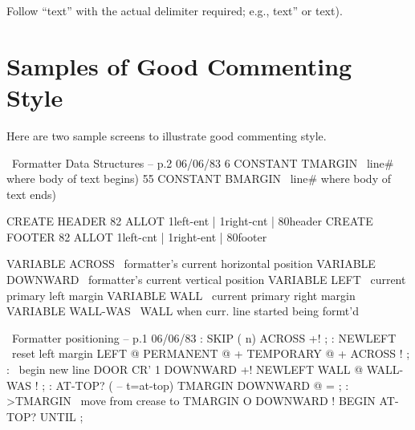 \noindent Follow ``text'' with the actual delimiter required; e.g., text'' or text).

\section{Samples of Good Commenting Style}

Here are two sample screens to illustrate good commenting
style.

\setcounter{screen}{126}
\begin{Screen}
\ Formatter         Data Structures -- p.2             06/06/83
 6 CONSTANT TMARGIN \ line# where body of text begins)
55 CONSTANT BMARGIN \ line# where body of text ends)

CREATE HEADER 82 ALLOT
  { 1left-ent | 1right-cnt | 80header }
CREATE FOOTER 82 ALLOT
  { 1left-cnt | 1right-ent | 80footer }

VARIABLE ACROSS   \ formatter's current horizontal position
VARIABLE DOWNWARD \ formatter's current vertical position
VARIABLE LEFT     \ current primary left margin
VARIABLE WALL     \ current primary right margin
VARIABLE WALL-WAS \ WALL when curr. line started being formt'd

\end{Screen}

\begin{Screen}
\ Formatter          positioning -- p.1               06/06/83
: SKIP  ( n)  ACROSS +! ;
: NEWLEFT  \ reset left margin
LEFT @  PERMANENT @ +  TEMPORARY @ +  ACROSS ! ;
: \LINE  \ begin new line
DOOR  CR'  1 DOWNWARD +!  NEWLEFT  WALL @  WALL-WAS ! ;
: AT-TOP?  ( -- t=at-top)  TMARGIN  DOWNWARD @ = ;
: >TMARGIN  \ move from crease to TMARGIN
O DOWNWARD !  BEGIN  \LINE  AT-TOP? UNTIL ;

\end{Screen}

